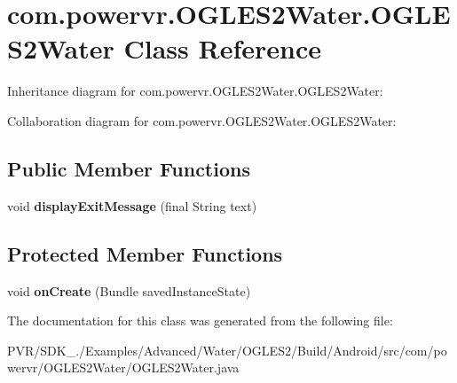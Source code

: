 \hypertarget{classcom_1_1powervr_1_1_o_g_l_e_s2_water_1_1_o_g_l_e_s2_water}{\section{com.\+powervr.\+O\+G\+L\+E\+S2\+Water.\+O\+G\+L\+E\+S2\+Water Class Reference}
\label{classcom_1_1powervr_1_1_o_g_l_e_s2_water_1_1_o_g_l_e_s2_water}
}


Inheritance diagram for com.\+powervr.\+O\+G\+L\+E\+S2\+Water.\+O\+G\+L\+E\+S2\+Water\+:


Collaboration diagram for com.\+powervr.\+O\+G\+L\+E\+S2\+Water.\+O\+G\+L\+E\+S2\+Water\+:
\subsection*{Public Member Functions}
\begin{DoxyCompactItemize}
\item 
\hypertarget{classcom_1_1powervr_1_1_o_g_l_e_s2_water_1_1_o_g_l_e_s2_water_aacc53efae69ab275a3cb903d75692159}{void {\bfseries display\+Exit\+Message} (final String text)}\label{classcom_1_1powervr_1_1_o_g_l_e_s2_water_1_1_o_g_l_e_s2_water_aacc53efae69ab275a3cb903d75692159}

\end{DoxyCompactItemize}
\subsection*{Protected Member Functions}
\begin{DoxyCompactItemize}
\item 
\hypertarget{classcom_1_1powervr_1_1_o_g_l_e_s2_water_1_1_o_g_l_e_s2_water_ad5c16b6af77500e7fa918f41acfd5fda}{void {\bfseries on\+Create} (Bundle saved\+Instance\+State)}\label{classcom_1_1powervr_1_1_o_g_l_e_s2_water_1_1_o_g_l_e_s2_water_ad5c16b6af77500e7fa918f41acfd5fda}

\end{DoxyCompactItemize}


The documentation for this class was generated from the following file\+:\begin{DoxyCompactItemize}
\item 
P\+V\+R/\+S\+D\+K\+\_./\+Examples/\+Advanced/\+Water/\+O\+G\+L\+E\+S2/\+Build/\+Android/src/com/powervr/\+O\+G\+L\+E\+S2\+Water/O\+G\+L\+E\+S2\+Water.\+java\end{DoxyCompactItemize}
